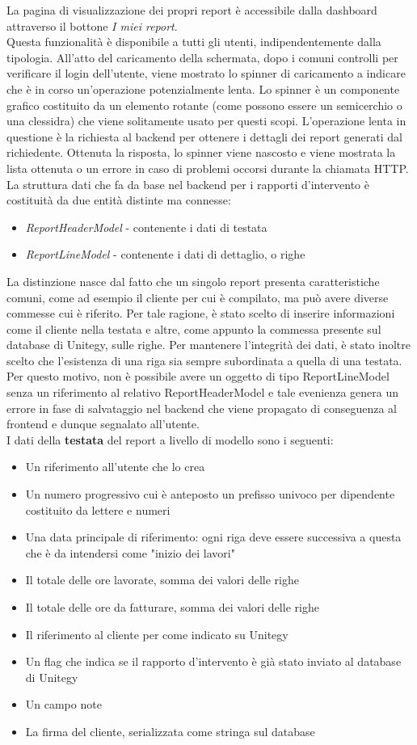 La pagina di visualizzazione dei propri report è accessibile dalla dashboard attraverso il bottone \emph{I miei report}.
\\
Questa funzionalità è disponibile a tutti gli utenti, indipendentemente dalla tipologia.
All'atto del caricamento della schermata, dopo i comuni controlli per verificare il login dell'utente, viene mostrato lo spinner di caricamento a indicare che è in corso 
un'operazione potenzialmente lenta.
Lo spinner è un componente grafico costituito da un elemento rotante (come possono essere un semicerchio o una clessidra) che viene solitamente usato per questi scopi.
L'operazione lenta in questione è la richiesta al backend per ottenere i dettagli dei report generati dal richiedente.
Ottenuta la risposta, lo spinner viene nascosto e viene mostrata la lista ottenuta o un errore in caso di problemi occorsi durante la chiamata HTTP.
La struttura dati che fa da base nel backend per i rapporti d'intervento è costituità da due entità distinte ma connesse:
\begin{itemize}
    \item \emph{ReportHeaderModel} - contenente i dati di testata
    \item \emph{ReportLineModel} - contenente i dati di dettaglio, o righe
\end{itemize}
La distinzione nasce dal fatto che un singolo report presenta caratteristiche comuni, come ad esempio il cliente per cui è compilato, ma può avere diverse commesse cui è riferito.
Per tale ragione, è stato scelto di inserire informazioni come il cliente nella testata e altre, come appunto la commessa presente sul database di Unitegy, sulle righe.
Per mantenere l'integrità dei dati, è stato inoltre scelto che l'esistenza di una riga sia sempre subordinata a quella di una testata.
Per questo motivo, non è possibile avere un oggetto di tipo ReportLineModel senza un riferimento al relativo ReportHeaderModel e tale evenienza genera un errore in fase di salvataggio
nel backend che viene propagato di conseguenza al frontend e dunque segnalato all'utente.
\\
I dati della \textbf{testata} del report a livello di modello sono i seguenti:
\begin{itemize}
    \item Un riferimento all'utente che lo crea
    \item Un numero progressivo cui è anteposto un prefisso univoco per dipendente costituito da lettere e numeri
    \item Una data principale di riferimento: ogni riga deve essere successiva a questa che è da intendersi come "inizio dei lavori"
    \item Il totale delle ore lavorate, somma dei valori delle righe
    \item Il totale delle ore da fatturare, somma dei valori delle righe
    \item Il riferimento al cliente per come indicato su Unitegy
    \item Un flag che indica se il rapporto d'intervento è già stato inviato al database di Unitegy
    \item Un campo note
    \item La firma del cliente, serializzata come stringa sul database
\end{itemize}
